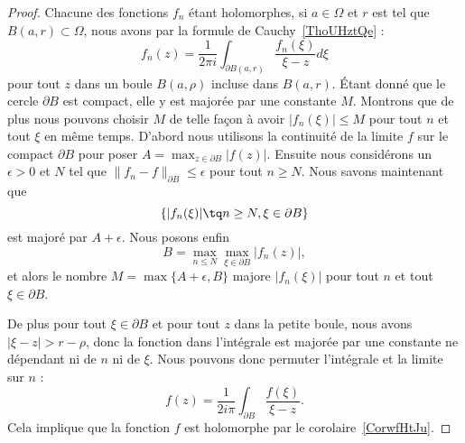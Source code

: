 \begin{proof}
	Chacune des fonctions \( f_n\) étant holomorphes, si \( a\in \Omega\) et \( r\) est tel que \( B(a,r)\subset \Omega\), nous avons par la formule de Cauchy~\ref{ThoUHztQe} :
	\begin{equation}
		f_n(z)=\frac{1}{ 2\pi i }\int_{\partial B(a,r)}\frac{ f_n(\xi) }{ \xi-z }d\xi
	\end{equation}
	pour tout \( z\) dans un boule \( B(a,\rho)\) incluse dans \( B(a,r)\). Étant donné que le cercle \( \partial B\) est compact, elle y est majorée par une constante \( M\). Montrons que de plus nous pouvons choisir \( M\) de telle façon à avoir \( | f_n(\xi) |\leq M\) pour tout \( n\) et tout \( \xi\) en même temps. D'abord nous utilisons la continuité de la limite \( f\) sur le compact \( \partial B \) pour poser \( A=\max_{z\in\partial B}| f(z) |\). Ensuite nous considérons un \( \epsilon>0\) et \( N\) tel que \( \| f_n-f \|_{\partial B}\leq \epsilon\) pour tout \( n\geq N\). Nous savons maintenant que
	\begin{equation}
		\{ | f_n(\xi) |\tq n \geq N,\xi\in\partial B \}
	\end{equation}
	est majoré par \( A+\epsilon\). Nous posons enfin
	\begin{equation}
		B=\max_{n\leq N}\max_{\xi\in\partial B}| f_n(z) |,
	\end{equation}
	et alors le nombre \( M=\max\{ A+\epsilon,B \}\) majore \( | f_n(\xi) |\) pour tout \( n\) et tout \( \xi\in\partial B\).

	De plus pour tout \( \xi\in\partial B\) et pour tout \( z\) dans la petite boule, nous avons \( | \xi-z |>r-\rho\), donc  la fonction dans l'intégrale est majorée par une constante ne dépendant ni de \( n\) ni de \( \xi\). Nous pouvons donc permuter l'intégrale et la limite sur \( n\) :
	\begin{equation}
		f(z)=\frac{1}{ 2i\pi }\int_{\partial B}\frac{ f(\xi) }{ \xi-z }.
	\end{equation}
	Cela implique que la fonction \( f\) est holomorphe par le corolaire~\ref{CorwfHtJu}.


\end{proof}
